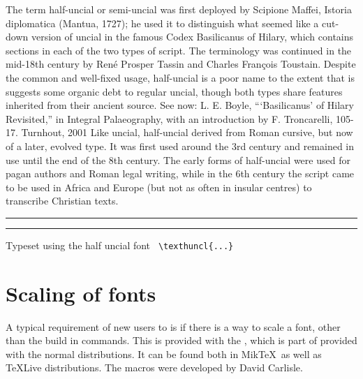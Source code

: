 \begin{multicols}{2}
\bigskip

The term half-uncial or semi-uncial was first deployed by Scipione Maffei, Istoria diplomatica (Mantua, 1727); he used it to distinguish what seemed like a cut-down version of uncial in the famous Codex Basilicanus of Hilary, which contains sections in each of the two types of script. The terminology was continued in the mid-18th century by René Prosper Tassin and Charles François Toustain. Despite the common and well-fixed usage, half-uncial is a poor name to the extent that is suggests some organic debt to regular uncial, though both types share features inherited from their ancient source. See now: L. E. Boyle, “‘Basilicanus’ of Hilary Revisited,” in Integral Palaeography, with an introduction by F. Troncarelli, 105-17. Turnhout, 2001
Like uncial, half-uncial derived from Roman cursive, but now of a later, evolved type. It was first used around the 3rd century and remained in use until the end of the 8th century. The early forms of half-uncial were used for pagan authors and Roman legal writing, while in the 6th century the script came to be used in Africa and Europe (but not as often in insular centres) to transcribe Christian texts.


\hrule
\medskip



\medskip
\hrule
\smallskip
\hfill\hfill Typeset using the half uncial font \verb+ \texthuncl{...} +


\section{Scaling of fonts}

A typical requirement of new users to \latex is if there is a way to scale a font, other than the build in commands.
This is provided with the , which is part of  provided with the normal 
\latex  distributions. It can be found both in Mik\TeX\ as well as \TeX Live distributions. The macros were developed by David Carlisle.



\end{multicols}
